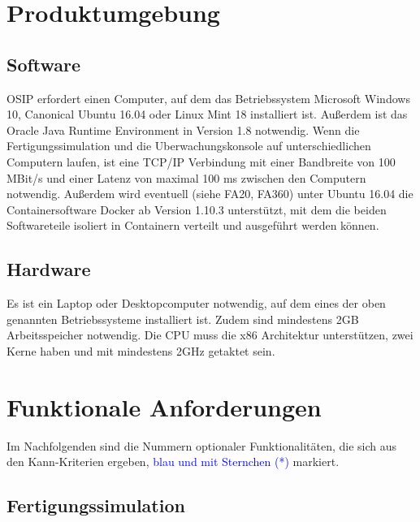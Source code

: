 \documentclass[parskip=full]{scrartcl}
\begin{document}
\pagebreak
\section{Produktumgebung}
\subsection{Software}
OSIP erfordert einen Computer, auf dem das Betriebssystem Microsoft Windows 10, Canonical Ubuntu 16.04 oder Linux Mint 18 installiert ist.
Außerdem ist das Oracle Java Runtime Environment in Version 1.8
notwendig. Wenn die \gls{Fertigungssimulation} und die \gls{Uberwachungskonsole} auf unterschiedlichen Computern laufen,
ist eine \gls{TCP/IP} Verbindung mit einer Bandbreite von 100 MBit/s und einer Latenz von maximal 100 ms zwischen den Computern notwendig.
Außerdem wird eventuell (siehe FA20, FA360) unter Ubuntu 16.04 die Containersoftware Docker
ab Version 1.10.3 unterstützt, mit dem die beiden Softwareteile isoliert in Containern verteilt und ausgeführt werden können.

\subsection{Hardware}
\label{Hardware}
Es ist ein Laptop oder Desktopcomputer notwendig, auf dem eines der oben genannten Betriebssysteme installiert ist.
Zudem sind mindestens 2GB Arbeitsspeicher notwendig. Die CPU muss die x86 Architektur unterstützen, zwei Kerne haben und mit
mindestens 2GHz getaktet sein.

\pagebreak
\section{Funktionale Anforderungen}
Im Nachfolgenden sind die Nummern optionaler Funktionalitäten, die sich aus den Kann-Kriterien ergeben, \textcolor{blue}{blau und mit Sternchen (*)} markiert.

\subsection{Fertigungssimulation}
\end{document}
